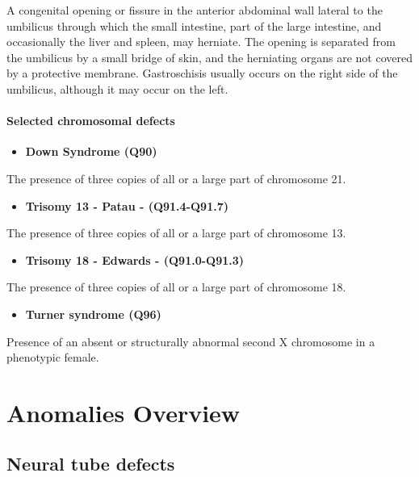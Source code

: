 \documentclass[
]{krantz}
\providecommand{\tightlist}{%
  \setlength{\itemsep}{0pt}\setlength{\parskip}{0pt}}
\begin{document}
A congenital opening or fissure in the anterior abdominal wall lateral to the umbilicus through which the small intestine, part of the large intestine, and occasionally the liver and spleen, may herniate. The opening is separated from the umbilicus by a small bridge of skin, and the herniating organs are not covered by a protective membrane. Gastroschisis usually occurs on the right side of the umbilicus, although it may occur on the left.

\hypertarget{section21112}{%
\subsubsection{Selected chromosomal defects}\label{section21112}}

\begin{itemize}
\tightlist
\item
  \textbf{Down Syndrome (Q90)}
\end{itemize}

The presence of three copies of all or a large part of chromosome 21.

\begin{itemize}
\tightlist
\item
  \textbf{Trisomy 13 - Patau - (Q91.4-Q91.7)}
\end{itemize}

The presence of three copies of all or a large part of chromosome 13.

\begin{itemize}
\tightlist
\item
  \textbf{Trisomy 18 - Edwards - (Q91.0-Q91.3)}
\end{itemize}

The presence of three copies of all or a large part of chromosome 18.

\begin{itemize}
\tightlist
\item
  \textbf{Turner syndrome (Q96)}
\end{itemize}

Presence of an absent or structurally abnormal second X chromosome in a phenotypic female.

\hypertarget{chapter3}{%
\chapter{Anomalies Overview}\label{chapter3}}

\hypertarget{section32}{%
\section{Neural tube defects}\label{section32}}
\end{document}
